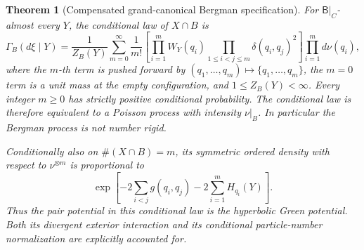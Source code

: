 \documentclass[11pt,a4paper]{article}
\numberwithin{equation}{section}
\newtheorem{theorem}{Theorem}[section]
\theoremstyle{definition}
\theoremstyle{remark}
\begin{document}
\begin{theorem}[Compensated grand-canonical Bergman specification]
\label{thm:bergman-grandcanonical-dlr}
For $\mathsf B|_C$-almost every $Y$, the conditional law of $X\cap B$
is
\begin{equation}
 \Gamma_B(d\xi\mid Y)
 =\frac1{Z_B(Y)}\sum_{m=0}^{\infty}\frac1{m!}
   \left[\prod_{i=1}^m W_Y(q_i)
   \prod_{1\leq i<j\leq m}\delta(q_i,q_j)^2\right]
   \prod_{i=1}^m d\nu(q_i),
 \label{eq:bergman-grandcanonical-dlr}
\end{equation}
where the $m$-th term is pushed forward by
$(q_1,\ldots,q_m)\mapsto\{q_1,\ldots,q_m\}$, the $m=0$ term is a
unit mass at the empty configuration, and $1\leq Z_B(Y)<\infty$.
Every integer $m\geq0$ has strictly positive conditional probability.
The conditional law is therefore equivalent to a Poisson process with
intensity $\nu|_B$.  In particular the Bergman process is not number rigid.

Conditionally also on $\#(X\cap B)=m$, its symmetric ordered density
with respect to $\nu^{\otimes m}$ is proportional to
\begin{equation}
 \exp\left[-2\sum_{i<j}g(q_i,q_j)
            -2\sum_{i=1}^m H_{q_i}(Y)\right].
 \label{eq:bergman-canonical-dlr}
\end{equation}
Thus the pair potential in this conditional law is the hyperbolic Green
potential.  Both its divergent exterior interaction and its conditional
particle-number normalization are explicitly accounted for.
\end{theorem}
\end{document}
